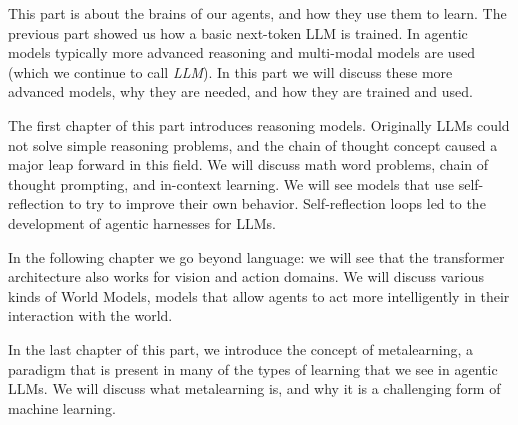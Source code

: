 This part is about the brains of our agents, and how they use them to learn.  
The previous part showed us how a basic next-token LLM is trained. In agentic models typically  more advanced reasoning and multi-modal models are used (which we continue to call {\em LLM}).  In this part we will discuss these more advanced models, why they are needed, and how they are trained and used.  

The first chapter of this part introduces reasoning models. 
Originally LLMs could not solve simple reasoning problems, and the chain of thought concept caused a major leap forward in this field. We will discuss math word problems, chain of thought prompting, and in-context learning. We will see models that use self-reflection to try to improve their own behavior. Self-reflection loops led to the development of agentic harnesses for LLMs. 

In the following chapter we go beyond language: we will see that the transformer architecture also works for vision and action domains. We will discuss various kinds of World Models, models  that allow agents to act more intelligently in their interaction with the world. 

In the last  chapter of this part, we introduce the concept of metalearning, a paradigm that is present in many of the types of learning that we see in agentic LLMs. We will discuss what metalearning is, and why it is a challenging form of machine learning.

